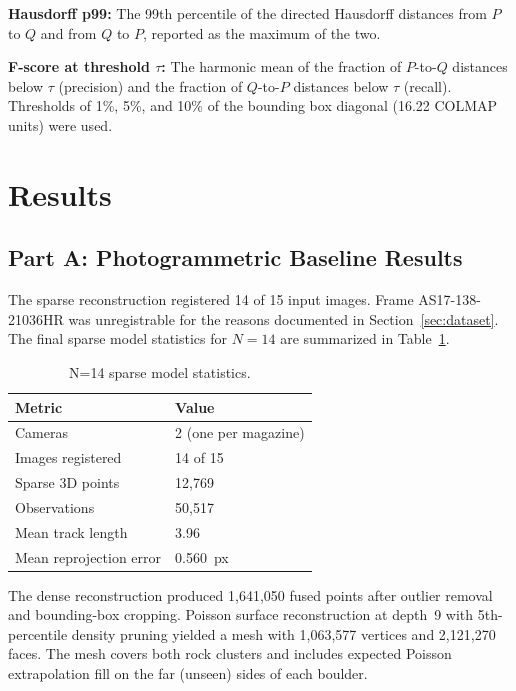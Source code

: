 \documentclass[12pt]{article}
\begin{document}
\textbf{Hausdorff p99:} The 99th percentile of the directed Hausdorff distances from $P$ to $Q$ and from $Q$ to $P$, reported as the maximum of the two.

\textbf{F-score at threshold $\tau$:} The harmonic mean of the fraction of $P$-to-$Q$ distances below $\tau$ (precision) and the fraction of $Q$-to-$P$ distances below $\tau$ (recall). Thresholds of 1\%, 5\%, and 10\% of the bounding box diagonal (16.22 COLMAP units) were used.

\section{Results}
\label{sec:results}

\subsection{Part A: Photogrammetric Baseline Results}

The sparse reconstruction registered 14 of 15 input images. Frame AS17-138-21036HR was unregistrable for the reasons documented in Section~\ref{sec:dataset}. The final sparse model statistics for $N{=}14$ are summarized in Table~\ref{tab:n14_sparse}.

\begin{table}[H]
\centering
\caption{N=14 sparse model statistics.}
\label{tab:n14_sparse}
\begin{tabular}{ll}
\toprule
Metric & Value \\
\midrule
Cameras & 2 (one per magazine) \\
Images registered & 14 of 15 \\
Sparse 3D points & 12,769 \\
Observations & 50,517 \\
Mean track length & 3.96 \\
Mean reprojection error & 0.560~px \\
\bottomrule
\end{tabular}
\end{table}

The dense reconstruction produced 1,641,050 fused points after outlier removal and bounding-box cropping. Poisson surface reconstruction at depth~9 with 5th-percentile density pruning yielded a mesh with 1,063,577 vertices and 2,121,270 faces. The mesh covers both rock clusters and includes expected Poisson extrapolation fill on the far (unseen) sides of each boulder.
\end{document}
